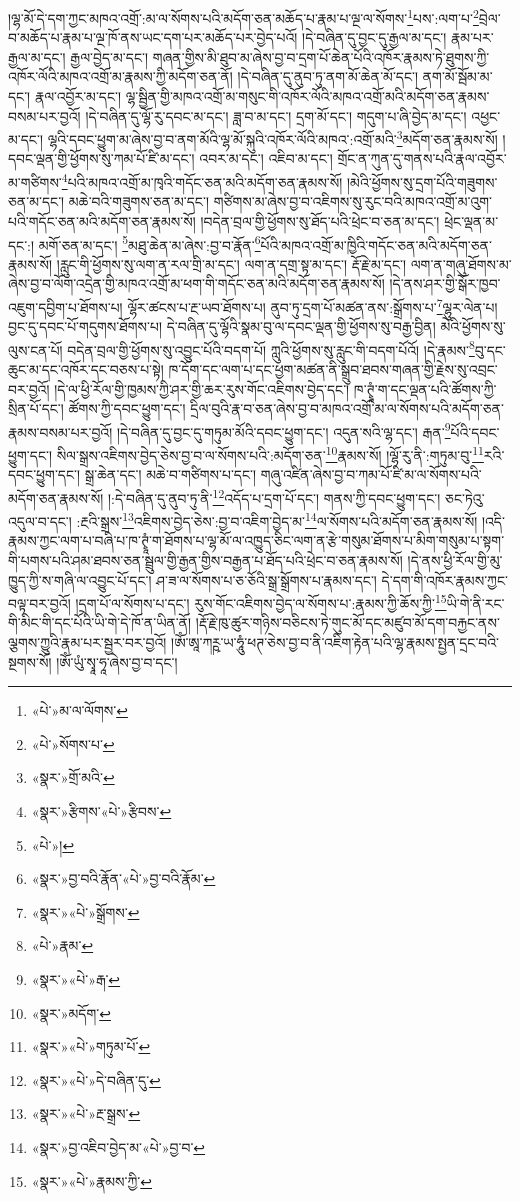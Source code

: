 །ལྷ་མོ་དེ་དག་ཀྱང་མཁའ་འགྲོ་:མ་ལ་སོགས་པའི་མདོག་ཅན་མཆོད་པ་རྣམ་པ་ལྔ་ལ་སོགས་\footnote{«པེ་»མ་ལ་ལོགས་}པས་:ལག་པ་\footnote{«པེ་»སོགས་པ་}བྲེལ་བ་མཆོད་པ་རྣམ་པ་ལྔ་ཁོ་ནས་ཡང་དག་པར་མཆོད་པར་བྱེད་པའོ། །དེ་བཞིན་དུ་བྱང་དུ་རྒྱལ་མ་དང་། རྣམ་པར་རྒྱལ་མ་དང་། རྒྱལ་བྱེད་མ་དང་། གཞན་གྱིས་མི་ཐུབ་མ་ཞེས་བྱ་བ་དྲག་པོ་ཆེན་པོའི་འཁོར་རྣམས་ཏེ་ཐུགས་ཀྱི་འཁོར་ལོའི་མཁའ་འགྲོ་མ་རྣམས་ཀྱི་མདོག་ཅན་ནོ། །དེ་བཞིན་དུ་ནུབ་ཏུ་ནག་མོ་ཆེན་མོ་དང་། ནག་མོ་སྦོམ་མ་དང་། རྣལ་འབྱོར་མ་དང་། ལྷ་སྦྱིན་གྱི་མཁའ་འགྲོ་མ་གསུང་གི་འཁོར་ལོའི་མཁའ་འགྲོ་མའི་མདོག་ཅན་རྣམས་བསམ་པར་བྱའོ། །དེ་བཞིན་དུ་ལྷོ་རུ་དབང་མ་དང་། ཟླ་བ་མ་དང་། དྲག་མོ་དང་། གདུག་པ་ཞི་བྱེད་མ་དང་། འཕྱང་མ་དང་། ལྷའི་དབང་ཕྱུག་མ་ཞེས་བྱ་བ་ནག་མོའི་ལྷ་མོ་སྐུའི་འཁོར་ལོའི་མཁའ་:འགྲོ་མའི་\footnote{«སྣར་»གྲོ་མའི་}མདོག་ཅན་རྣམས་སོ། །དབང་ལྡན་གྱི་ཕྱོགས་སུ་ཀམ་པོ་ཛི་མ་དང་། འབར་མ་དང་། འཇིབ་མ་དང་། གྲོང་ན་ཀུན་དུ་གནས་པའི་རྣལ་འབྱོར་མ་གཙིགས་\footnote{«སྣར་»རྩིགས་«པེ་»རྩིབས་}པའི་མཁའ་འགྲོ་མ་ཁྭའི་གདོང་ཅན་མའི་མདོག་ཅན་རྣམས་སོ། །མེའི་ཕྱོགས་སུ་དྲག་པོའི་གཟུགས་ཅན་མ་དང་། མཆེ་བའི་གཟུགས་ཅན་མ་དང་། གཙིགས་མ་ཞེས་བྱ་བ་འཇིགས་སུ་རུང་བའི་མཁའ་འགྲོ་མ་འུག་པའི་གདོང་ཅན་མའི་མདོག་ཅན་རྣམས་སོ། །བདེན་བྲལ་གྱི་ཕྱོགས་སུ་ཐོད་པའི་ཕྲེང་བ་ཅན་མ་དང་། ཕྲེང་ལྡན་མ་དང་:། མགོ་ཅན་མ་དང་། \footnote{«པེ་»།  }མཐུ་ཆེན་མ་ཞེས་:བྱ་བ་རྣོན་\footnote{«སྣར་»བྱ་བའི་རྣོན་«པེ་»བྱ་བའི་རྣོམ་}པོའི་མཁའ་འགྲོ་མ་ཁྱིའི་གདོང་ཅན་མའི་མདོག་ཅན་རྣམས་སོ། །རླུང་གི་ཕྱོགས་སུ་ལག་ན་རལ་གྲི་མ་དང་། ལག་ན་དགྲ་སྟ་མ་དང་། རྡོ་རྗེ་མ་དང་། ལག་ན་གཞུ་ཐོགས་མ་ཞེས་བྱ་བ་ལོག་འདྲེན་གྱི་མཁའ་འགྲོ་མ་ཕག་གི་གདོང་ཅན་མའི་མདོག་ཅན་རྣམས་སོ། །དེ་ནས་ཤར་གྱི་སྒོར་ཁྱབ་འཇུག་དབྱིག་པ་ཐོགས་པ། ལྷོར་ཚངས་པ་རྔ་ཡབ་ཐོགས་པ། ནུབ་ཏུ་དྲག་པོ་མཚན་ནས་:སྒྲོགས་པ་\footnote{«སྣར་»«པེ་»སྒྲོགས་}ལྷུར་ལེན་པ། བྱང་དུ་དབང་པོ་གདུགས་ཐོགས་པ། དེ་བཞིན་དུ་ལྷོའི་སྣམ་བུ་ལ་དབང་ལྡན་གྱི་ཕྱོགས་སུ་བརྒྱ་བྱིན། མེའི་ཕྱོགས་སུ་ལུས་ངན་པོ། བདེན་བྲལ་གྱི་ཕྱོགས་སུ་འབྱུང་པོའི་བདག་པོ། ཀླུའི་ཕྱོགས་སུ་རླུང་གི་བདག་པོའོ། །དེ་རྣམས་\footnote{«པེ་»རྣམ་}བུ་དང་ཆུང་མ་དང་འཁོར་དང་བཅས་པ་སྟེ། ཁ་དོག་དང་ལག་པ་དང་ཕྱག་མཚན་ནི་སྒྲུབ་ཐབས་གཞན་གྱི་རྗེས་སུ་འབྲང་བར་བྱའོ། །དེ་ལ་ཕྱི་རོལ་གྱི་ཁྱམས་ཀྱི་ཤར་གྱི་ཆར་རུས་གོང་འཇིགས་བྱེད་དང་། ཁ་ཊྭཱཾ་ག་དང་ལྡན་པའི་ཚོགས་ཀྱི་སྲིན་པོ་དང་། ཚོགས་ཀྱི་དབང་ཕྱུག་དང་། དྲིལ་བུའི་རྣ་བ་ཅན་ཞེས་བྱ་བ་མཁའ་འགྲོ་མ་ལ་སོགས་པའི་མདོག་ཅན་རྣམས་བསམ་པར་བྱའོ། །དེ་བཞིན་དུ་བྱང་དུ་གཏུམ་མོའི་དབང་ཕྱུག་དང་། འདུན་སའི་ལྷ་དང་། རྒན་\footnote{«སྣར་»«པེ་»རྒ་}པོའི་དབང་ཕྱུག་དང་། སིལ་སྒྲས་འཇིགས་བྱེད་ཅེས་བྱ་བ་ལ་སོགས་པའི་:མདོག་ཅན་\footnote{«སྣར་»མདོག་}རྣམས་སོ། །ལྷོ་རུ་ནི་:གཏུམ་བུ་\footnote{«སྣར་»«པེ་»གཏུམ་པོ་}རའི་དབང་ཕྱུག་དང་། སྒྲ་ཆེན་དང་། མཆེ་བ་གཙིགས་པ་དང་། གཞུ་འཛིན་ཞེས་བྱ་བ་ཀམ་པོ་ཛི་མ་ལ་སོགས་པའི་མདོག་ཅན་རྣམས་སོ། །:དེ་བཞིན་དུ་ནུབ་ཏུ་ནི་\footnote{«སྣར་»«པེ་»དེ་བཞིན་དུ་}འདོད་པ་དྲག་པོ་དང་། གནས་ཀྱི་དབང་ཕྱུག་དང་། ཅང་ཏེའུ་འདུལ་བ་དང་། :རྔའི་སྒྲས་\footnote{«སྣར་»«པེ་»རྔ་སྒྲས་}འཇིགས་བྱེད་ཅེས་:བྱ་བ་འཇིག་བྱེད་མ་\footnote{«སྣར་»བྱ་འཇིབ་བྱེད་མ་«པེ་»བྱ་བ་}ལ་སོགས་པའི་མདོག་ཅན་རྣམས་སོ། །འདི་རྣམས་ཀྱང་ལག་པ་བཞི་པ་ཁ་ཊྭཱཾ་ག་ཐོགས་པ་ལྷ་མོ་ལ་འཁྱུད་ཅིང་ལག་ན་རྩེ་གསུམ་ཐོགས་པ་མིག་གསུམ་པ་སྟག་གི་པགས་པའི་ཤམ་ཐབས་ཅན་སྦྲུལ་གྱི་རྒྱན་གྱིས་བརྒྱན་པ་ཐོད་པའི་ཕྲེང་བ་ཅན་རྣམས་སོ། །དེ་ནས་ཕྱི་རོལ་གྱི་མུ་ཁྱུད་ཀྱི་ས་གཞི་ལ་འབྱུང་པོ་དང་། ཤ་ཟ་ལ་སོགས་པ་ཅ་ཅོའི་སྒྲ་སྒྲོགས་པ་རྣམས་དང་། དེ་དག་གི་འཁོར་རྣམས་ཀྱང་བལྟ་བར་བྱའོ། །དྲག་པོ་ལ་སོགས་པ་དང་། རུས་གོང་འཇིགས་བྱེད་ལ་སོགས་པ་:རྣམས་ཀྱི་ཆོས་ཀྱི་\footnote{«སྣར་»«པེ་»རྣམས་ཀྱི་}ཡི་གེ་ནི་རང་གི་མིང་གི་དང་པོའི་ཡི་གེ་དེ་ཁོ་ན་ཡིན་ནོ། །རྡོ་རྗེ་ཁུ་ཚུར་གཉིས་བཅིངས་ཏེ་གུང་མོ་དང་མཛུབ་མོ་དག་བརྐྱང་ནས་ལྕགས་ཀྱུའི་རྣམ་པར་སྦྱར་བར་བྱའོ། །ཨོཾ་ཨཱ་ཀཪྵ་ཡ་ཧཱུཾ་ཕཊ་ཅེས་བྱ་བ་ནི་འཇིག་རྟེན་པའི་ལྷ་རྣམས་སྤྱན་དྲང་བའི་སྔགས་སོ། །ཨོཾ་ཡུཾ་སྭཱ་ཧཱ་ཞེས་བྱ་བ་དང་། 